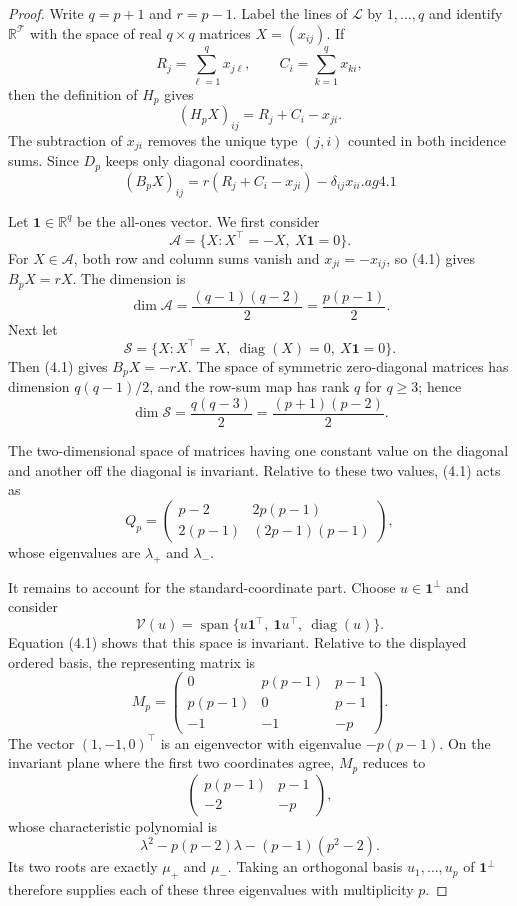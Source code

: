 \documentclass[10pt,a4paper]{amsart}
\newcommand{\calL}{\mathcal{L}}
\newcommand{\calT}{\mathcal{T}}
\newcommand{\one}{\mathbf{1}}
\begin{document}
	\begin{proof}
		Write $q=p+1$ and $r=p-1$. Label the lines of $\calL$ by $1,\ldots,q$ and identify $\mathbb R^{\calT}$ with the space of real $q\times q$ matrices $X=(x_{ij})$. If
		$$
		R_j=\sum_{\ell=1}^q x_{j\ell},
		\qquad
		C_i=\sum_{k=1}^q x_{ki},
		$$
		then the definition of $H_p$ gives
		$$
		(H_pX)_{ij}=R_j+C_i-x_{ji}.
		$$
		The subtraction of $x_{ji}$ removes the unique type $(j,i)$ counted in both incidence sums. Since $D_p$ keeps only diagonal coordinates,
		$$
		(B_pX)_{ij}=r(R_j+C_i-x_{ji})-\delta_{ij}x_{ii}.
		ag{4.1}
		$$
		
		Let $\one\in\mathbb R^q$ be the all-ones vector. We first consider
		$$
		\mathscr A=\{X:X^{\top}=-X,\ X\one=0\}.
		$$
		For $X\in\mathscr A$, both row and column sums vanish and $x_{ji}=-x_{ij}$, so (4.1) gives $B_pX=rX$. The dimension is
		$$
		\dim\mathscr A=\frac{(q-1)(q-2)}{2}=\frac{p(p-1)}{2}.
		$$
		Next let
		$$
		\mathscr S=\{X:X^{\top}=X,\ \operatorname{diag}(X)=0,\ X\one=0\}.
		$$
		Then (4.1) gives $B_pX=-rX$. The space of symmetric zero-diagonal matrices has dimension $q(q-1)/2$, and the row-sum map has rank $q$ for $q\ge3$; hence
		$$
		\dim\mathscr S=\frac{q(q-3)}{2}=\frac{(p+1)(p-2)}{2}.
		$$
		
		The two-dimensional space of matrices having one constant value on the diagonal and another off the diagonal is invariant. Relative to these two values, (4.1) acts as
		$$
		Q_p=
		\begin{pmatrix}
			p-2&2p(p-1)\\
			2(p-1)&(2p-1)(p-1)
		\end{pmatrix},
		$$
		whose eigenvalues are $\lambda_+$ and $\lambda_-$.
		
		It remains to account for the standard-coordinate part. Choose $u\in\one^{\perp}$ and consider
		$$
		\mathscr V(u)=\operatorname{span}\{u\one^{\top},\ \one u^{\top},\ \operatorname{diag}(u)\}.
		$$
		Equation (4.1) shows that this space is invariant. Relative to the displayed ordered basis, the representing matrix is
		$$
		M_p=
		\begin{pmatrix}
			0&p(p-1)&p-1\\
			p(p-1)&0&p-1\\
			-1&-1&-p
		\end{pmatrix}.
		$$
		The vector $(1,-1,0)^{\top}$ is an eigenvector with eigenvalue $-p(p-1)$. On the invariant plane where the first two coordinates agree, $M_p$ reduces to
		$$
		\begin{pmatrix}
			p(p-1)&p-1\\
			-2&-p
		\end{pmatrix},
		$$
		whose characteristic polynomial is
		$$
		\lambda^2-p(p-2)\lambda-(p-1)(p^2-2).
		$$
		Its two roots are exactly $\mu_+$ and $\mu_-$. Taking an orthogonal basis $u_1,\ldots,u_p$ of $\one^{\perp}$ therefore supplies each of these three eigenvalues with multiplicity $p$.
		

\end{proof}
\end{document}
